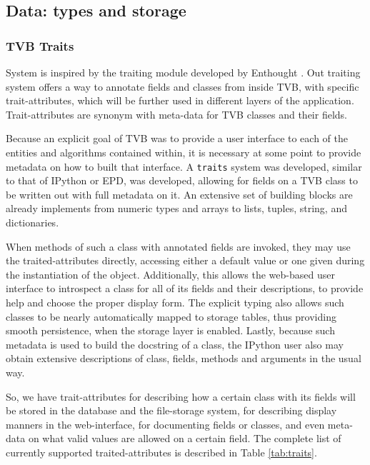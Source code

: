 \subsection{Data: types and storage}



	\subsubsection{TVB Traits}

System is inspired by the traiting module developed by Enthought \cite{EnthoughtTraits}.
Out traiting system offers a way to annotate fields and classes from inside TVB, with specific trait-attributes,
which will be further used in different layers of the application.
Trait-attributes are synonym with meta-data for TVB classes and their fields.

Because an explicit goal of TVB was to provide a user interface to each of the
entities and algorithms contained within, it is necessary at some point to
provide metadata on how to built that interface. A \texttt{traits} system was developed, similar to that of
IPython or EPD, was developed, allowing for fields on a TVB class to
be written out with full metadata on it. An extensive set of  building 
blocks are already implements from numeric types and arrays to lists, tuples, 
string, and dictionaries.

 When methods of such a class with annotated fields are invoked,
they may use the traited-attributes directly, accessing either a default value
or one given during the instantiation of the object. Additionally, this allows
the web-based user interface to introspect a class for all of its fields and their
descriptions, to provide help and choose the proper display form. The explicit typing also allows
such classes to be nearly automatically mapped to storage tables,
thus providing smooth persistence, when the storage layer is enabled.  
Lastly, because such metadata is used to build the docstring of a class,
the IPython user also may obtain extensive descriptions of class, fields, methods and
arguments in the usual way. 

So, we have trait-attributes for describing how a certain class with its fields 
will be stored in the database and the file-storage system,
for describing display manners in the web-interface, for documenting fields or classes, 
and even meta-data on what valid values are allowed on a certain field. 
The complete list of currently supported traited-attributes is described in Table \ref{tab:traits}.

